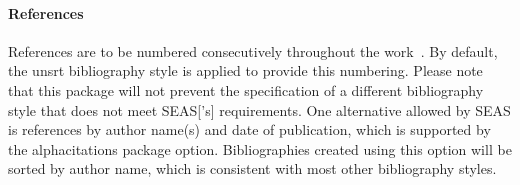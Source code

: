 \documentclass[10pt]{article}
\newcommand{\option}[1]{#1}
\begin{document}
\paragraph{References}
References are to be numbered consecutively throughout the work~\cite{seas:instructions}.
By default, the unsrt bibliography style is applied to provide this numbering.
Please note that this package will not prevent the specification of a different bibliography style that does not meet \gls{SEAS}['s] requirements.
One alternative allowed by \gls{SEAS} is references by author name(s) and date of publication, which is supported by the \option{alphacitations} package option.
Bibliographies created using this option will be sorted by author name, which is consistent with most other bibliography styles.

\raggedright


\end{document}
